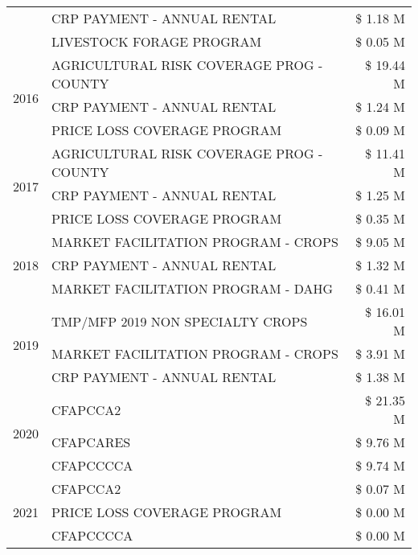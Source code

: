 \begin{tabular}{llr}
 & CRP PAYMENT - ANNUAL RENTAL & \$ 1.18 M \\
 & LIVESTOCK FORAGE PROGRAM & \$ 0.05 M \\
\cline{1-3}
\multirow[t]{3}{*}{2016} & AGRICULTURAL RISK COVERAGE PROG - COUNTY & \$ 19.44 M \\
 & CRP PAYMENT - ANNUAL RENTAL & \$ 1.24 M \\
 & PRICE LOSS COVERAGE PROGRAM & \$ 0.09 M \\
\cline{1-3}
\multirow[t]{3}{*}{2017} & AGRICULTURAL RISK COVERAGE PROG - COUNTY & \$ 11.41 M \\
 & CRP PAYMENT - ANNUAL RENTAL & \$ 1.25 M \\
 & PRICE LOSS COVERAGE PROGRAM & \$ 0.35 M \\
\cline{1-3}
\multirow[t]{3}{*}{2018} & MARKET FACILITATION PROGRAM - CROPS & \$ 9.05 M \\
 & CRP PAYMENT - ANNUAL RENTAL & \$ 1.32 M \\
 & MARKET FACILITATION PROGRAM - DAHG & \$ 0.41 M \\
\cline{1-3}
\multirow[t]{3}{*}{2019} & TMP/MFP 2019 NON SPECIALTY CROPS & \$ 16.01 M \\
 & MARKET FACILITATION PROGRAM - CROPS & \$ 3.91 M \\
 & CRP PAYMENT - ANNUAL RENTAL & \$ 1.38 M \\
\cline{1-3}
\multirow[t]{3}{*}{2020} & CFAPCCA2 & \$ 21.35 M \\
 & CFAPCARES & \$ 9.76 M \\
 & CFAPCCCCA & \$ 9.74 M \\
\cline{1-3}
\multirow[t]{3}{*}{2021} & CFAPCCA2 & \$ 0.07 M \\
 & PRICE LOSS COVERAGE PROGRAM & \$ 0.00 M \\
 & CFAPCCCCA & \$ 0.00 M \\
\cline{1-3}
\bottomrule
\end{tabular}
